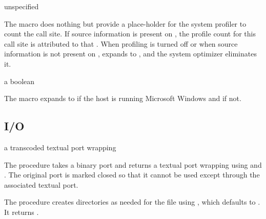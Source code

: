 \begin{syntax}
\end{syntax}
\returns{} unspecified

The  macro does nothing but provide a
place-holder for the system profiler to count the call site.
If source information is present on , the profile count
for this call site is attributed to that .
When profiling is turned off or when source information is not
present on ,  expands to
, and the system optimizer eliminates it.

\begin{syntax}
\end{syntax}
\expandsto{} a boolean

The  macro expands to  if the host is running
Microsoft Windows and  if not.

\subsection {I/O}

\begin{procedure}
\end{procedure}
\returns{} a transcoded textual port wrapping 

The  procedure takes a binary port  and
returns a textual port wrapping  using
 and . The
original port  is marked closed so that it cannot be used
except through the associated textual port.

\begin{procedure}
\end{procedure}
\returns{} 

The  procedure creates directories as needed
for the file  using , which defaults to
. It returns .

